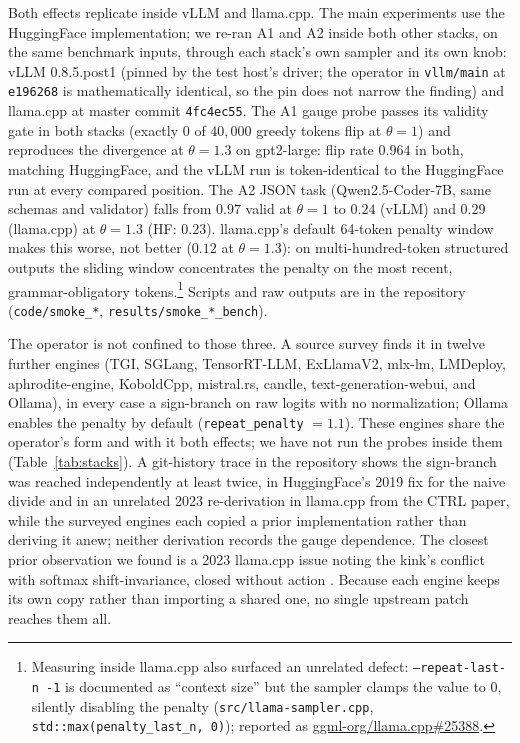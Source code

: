 \documentclass[11pt]{article}
\newcommand{\thp}{\theta}
\newcommand{\code}[1]{\texttt{#1}}
\begin{document}
Both effects replicate inside vLLM and llama.cpp. The main experiments use the HuggingFace
implementation; we re-ran A1 and A2 inside both other stacks, on the same benchmark inputs,
through each stack's own sampler and its own
knob: vLLM 0.8.5.post1 (pinned by the test host's driver; the operator in \code{vllm/main} at
\code{e196268} is mathematically identical, so the pin does not narrow the finding) and llama.cpp
at master commit \code{4fc4ec55}. The A1
gauge probe passes its validity gate in both stacks (exactly $0$ of $40{,}000$ greedy tokens flip at
$\thp=1$) and reproduces the divergence at $\thp=1.3$ on gpt2-large: flip rate $0.964$ in both,
matching HuggingFace, and the vLLM run is token-identical to the HuggingFace run at every compared
position. The A2 JSON task (Qwen2.5-Coder-7B, same
schemas and validator) falls
from $0.97$ valid at $\thp=1$ to $0.24$ (vLLM) and $0.29$ (llama.cpp) at $\thp=1.3$ (HF: $0.23$).
llama.cpp's default 64-token penalty window makes this worse, not better ($0.12$ at $\thp=1.3$):
on multi-hundred-token structured outputs the sliding window concentrates the penalty on the most
recent, grammar-obligatory tokens.\footnote{Measuring inside llama.cpp also
surfaced an unrelated defect: \code{--repeat-last-n -1} is documented as ``context size'' but the
sampler clamps the value to $0$, silently disabling the penalty
(\code{src/llama-sampler.cpp}, \code{std::max(penalty\_last\_n, 0)}); reported as
\href{https://github.com/ggml-org/llama.cpp/issues/25388}{ggml-org/llama.cpp\#25388}.} Scripts and raw outputs are
in the repository (\code{code/smoke\_*}, \code{results/smoke\_*\_bench}).

The operator is not confined to those three. A source survey finds it in twelve
further engines (TGI, SGLang, TensorRT-LLM, ExLlamaV2, mlx-lm, LMDeploy, aphrodite-engine,
KoboldCpp, mistral.rs, candle, text-generation-webui, and Ollama), in every case a sign-branch on
raw logits with no normalization; Ollama enables the penalty by default
(\code{repeat\_penalty} $= 1.1$). These engines share the operator's form and with it both
effects; we have not
run the probes inside them (Table~\ref{tab:stacks}). A git-history trace in the repository shows
the sign-branch was reached independently at least twice, in HuggingFace's 2019 fix for the naive
divide and in an unrelated 2023 re-derivation in llama.cpp from the CTRL paper, while the surveyed
engines each copied a prior implementation rather than deriving it anew; neither derivation records
the gauge dependence. The closest prior observation we found is a 2023 llama.cpp issue noting the
kink's conflict with softmax shift-invariance, closed without action \citep{llamacpp2970}.
Because each engine keeps its own copy rather than importing a shared one, no
single upstream patch reaches them all.
\end{document}
